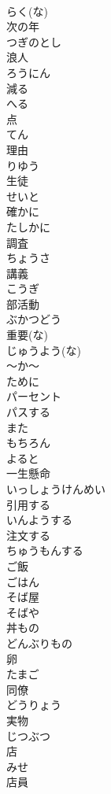 \documentclass[8pt]{extreport}
\begin{document}
\begin{CJK}{UTF8}{min}
\\	らく(な)
\\	次の年	
\\	つぎのとし
\\	浪人	
\\	ろうにん
\\	減る	
\\	へる
\\	点	
\\	てん
\\	理由	
\\	りゆう
\\	生徒	
\\	せいと
\\	確かに	
\\	たしかに
\\	調査	
\\	ちょうさ
\\	講義	
\\	こうぎ
\\	部活動	
\\	ぶかつどう
\\	重要(な)	
\\	じゅうよう(な)
\\	～か～	
\\	ために	
\\	パーセント	
\\	パスする	
\\	また	
\\	もちろん	
\\	よると	
\\	一生懸命	
\\	いっしょうけんめい
\\	引用する	
\\	いんようする
\\	注文する	
\\	ちゅうもんする
\\	ご飯	
\\	ごはん
\\	そば屋	
\\	そばや
\\	丼もの	
\\	どんぶりもの
\\	卵	
\\	たまご
\\	同僚	
\\	どうりょう
\\	実物	
\\	じつぶつ
\\	店	
\\	みせ
\\	店員	

\end{CJK}
\end{document}
